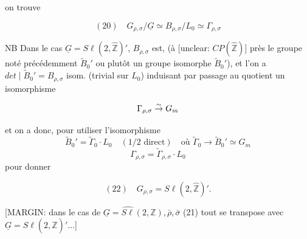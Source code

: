 \begin{enumerate}
on trouve

$$ (20) \quad G_{\rho,\sigma} / \underline{G} \simeq B_{\rho,\sigma} / L_0 \simeq \Gamma_{\rho,\sigma} $$

NB Dans le cas $\underline{G} = S \ell(2, \hat{\mathbb{Z}})'$, $B_{\rho,\sigma}$ est,
(à [unclear: $C P(\hat{\mathbb{Z}})$] près le groupe noté précédemment $\tilde{B}_0'$
ou plutôt un groupe isomorphe $\tilde{B}_0'$), et
l'on a $det \mid \tilde{B}_0' = B_{\rho,\sigma}$ isom. (trivial sur $L_0$)
induisant par passage au quotient un isomorphisme

$$ \Gamma_{\rho,\sigma} \buildrel \sim \over \to G_m $$

et on a donc, pour utiliser l'isomorphisme
$$ \tilde{B}_0' = \tilde{\Gamma}_0 \cdot L_0 \quad (\text{1/2 direct}) \quad \text{où } \tilde{\Gamma}_0 \to \tilde{B}_0' \simeq G_m $$
$$ \Gamma_{\rho,\sigma} = \tilde{\Gamma}_{\rho,\sigma} \cdot L_0 $$
pour donner

$$ (22) \quad G_{\rho,\sigma} = S \ell(2, \hat{\mathbb{Z}})' . $$

[MARGIN: dans le cas de $\underline{G} = \widehat{S \ell}(2, \mathbb{Z}), \bar{\rho}, \bar{\sigma}$ (21)
tout se transpose avec
$\underline{G} = S \ell(2, \hat{\mathbb{Z}})' \dots$]

\newpage



\newpage



\newpage



\newpage



\newpage



\newpage




\end{enumerate}
